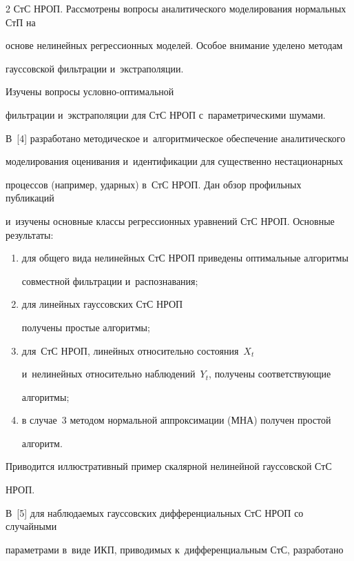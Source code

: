 \begin{multicols}{2}
СтС НРОП. Рассмотрены вопросы аналитического моделирования нормальных СтП на 

основе нелинейных регрессионных моделей. Особое внимание уделено методам 

гауссовской фильтрации и~экстраполяции.\linebreak

 Изуче\-ны вопросы услов\-но-оп\-ти\-маль\-ной 

фильт\-ра\-ции и~экстраполяции для СтС НРОП с~па\-ра\-мет\-ри\-че\-ски\-ми шумами.

В~[4] разработано методическое и~алгоритмическое обеспечение аналитического 

моделирования оценивания и~\mbox{идентификации} для существенно нестационарных 

процессов (например, ударных) в~СтС НРОП. Дан обзор профильных пуб\-ли\-ка\-ций 

и~изучены основные классы регрессионных уравнений СтС НРОП. Основные ре\-зуль\-таты: 

\begin{enumerate}[(1)]

\item для общего вида нелинейных СтС НРОП приведены оптимальные алгоритмы 

совместной фильтрации и~распознавания; 

\item для линейных гауссовских СтС НРОП 

получены простые алгоритмы; 

\item для~СтС НРОП, линейных относительно состояния~$X_t$ 

и~нелинейных относительно наблюдений~$Y_t$, получены соответствующие  

алгоритмы; 

\item в случае~3 методом нормальной аппроксимации (МНА) получен простой 

алгоритм.

\end{enumerate}

 Приводится иллюстративный пример скалярной нелинейной гауссовской СтС 

НРОП.



В~[5] для наблюдаемых гауссовских дифференциальных СтС НРОП со случайными 

параметрами в~виде ИКП, приводимых к~дифференциальным СтС, разработано 


\end{multicols}
